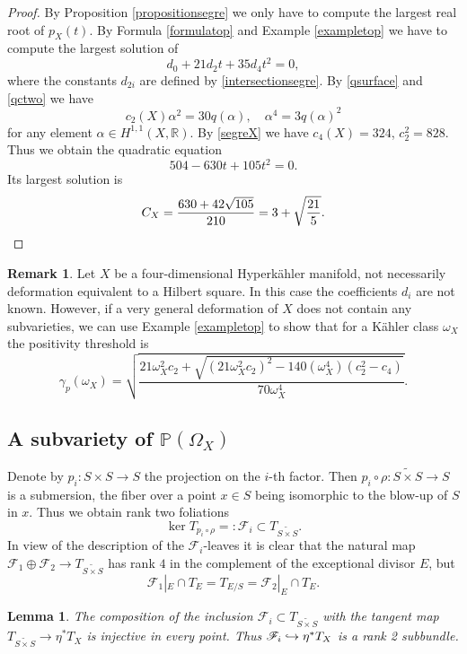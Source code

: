 \documentclass[11pt]{article}
\let\mathcal\mathscr
\newcommand\hto{\mathrel{\lhook\joinrel\to}}
\theoremstyle{plain}
\newtheorem{lemma}[theorem]{Lemma}
\theoremstyle{definition}
\newtheorem{remark}[theorem]{Remark}
\newcommand{\R}{\ensuremath{\mathbb{R}}}
\newcommand{\PP}{\ensuremath{\mathbb{P}}}
\newcommand{\holom}[3]{\ensuremath{#1:#2\to #3}}
\newcommand\sF{{\mathcal F}}
\newcommand{\blS}{\ensuremath{\widetilde{S \times S}}}
\begin{document}
\begin{proof}
By Proposition \ref{propositionsegre} we only have to compute the
largest real root of $p_X(t)$.
By Formula \eqref{formulatop} and Example \ref{exampletop}
we have to compute the largest solution of
\[
d_0 + 21 d_2 t + 35 d_4 t^2 = 0,
\]
where the constants $d_{2i}$ are defined by \eqref{intersectionsegre}.
By \eqref{qsurface} and \eqref{qctwo} we have
\[
c_2(X)\alpha^2=30 q(\alpha), \quad \alpha^4=3 q(\alpha)^2
\]
for any element $\alpha\in H^{1,1}(X, \R)$.
By \eqref{segreX} we have $c_4(X)=324$, $c_2^2=828$. Thus we
obtain the quadratic equation
\[
504 - 630 t + 105 t^2 = 0.
\]
Its largest solution is
\[
C_X = \frac{630 + 42 \sqrt{105}}{210} = 3 + \sqrt{\frac{21}{5}}.\qedhere
\]
\end{proof}

\begin{remark}
Let $X$ be a four-dimensional Hyperkähler manifold, not necessarily deformation equivalent to a Hilbert square.
In this case the coefficients $d_i$ are not known. However, if a very general deformation of $X$ does not contain any subvarieties, we can use Example \ref{exampletop} to show that
for a Kähler class $\omega_X$ the
positivity threshold is
\[
\gamma_p(\omega_X)=\sqrt{
\frac{21 \omega_X^2 c_2+\sqrt{(21\omega_X^2c_2)^2- 140(\omega_X^4)(c_2^2-c_4) }}{70\omega_X^4}}.
\]
\end{remark}

\subsection{A subvariety of $\PP(\Omega_X)$} \label{subsectionZ}

Denote by $\holom{p_i}{S \times S}{S}$ the projection on the $i$-th factor.
Then $p_i \circ \rho: \blS \to S$ is a submersion,
the fiber over a point $x \in S$ being isomorphic to the blow-up of $S$ in $x$.
Thus we obtain rank two foliations
\[
\ker T_{p_i \circ \rho} =: \sF_i \subset T_{\blS}.
\]
In view of the description of the $\sF_i$-leaves it is clear that the natural map $\sF_1 \oplus \sF_2 \to T_{\blS}$ has rank $4$ in the complement of the exceptional divisor $E$, but
\[
\sF_1|_E \cap T_E = T_{E/S} = \sF_2|_E \cap T_E.
\]

\begin{lemma} \label{lemmainjection}
The composition of the inclusion $\sF_i \subset T_{\blS}$ with the tangent map $T_{\blS} \to \eta^* T_X$
is injective in every point. Thus $\sF_i \hto \eta^* T_X$ is a rank 2 subbundle.
\end{lemma}
\end{document}

